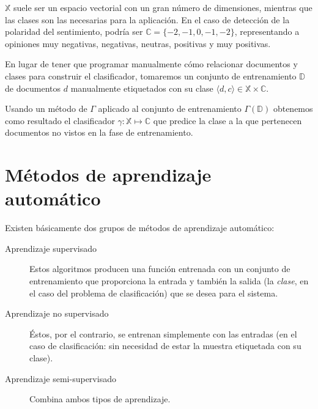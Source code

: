 $\mathbb{X}$ suele ser un espacio vectorial con un gran número de dimensiones, mientras que las clases son las necesarias para la aplicación. En el caso de detección de la polaridad del sentimiento, podría ser $\mathbb{C}=\{-2,-1,0,-1,-2\}$, representando a opiniones muy negativas, negativas, neutras, positivas y muy positivas.

En lugar de tener que programar manualmente cómo relacionar documentos y clases para construir el clasificador, tomaremos un conjunto de entrenamiento $\mathbb{D}$ de documentos $d$ manualmente etiquetados con su clase $\langle d, c \rangle \in \mathbb{X} \times \mathbb{C}$.

Usando un método de  $\Gamma$ aplicado al conjunto de entrenamiento $\Gamma(\mathbb{D})$ obtenemos como resultado el clasificador $\gamma : \mathbb{X} \mapsto \mathbb{C}$ \citep{Manning2008} que predice la clase a la que pertenecen documentos no vistos en la fase de entrenamiento.

\section{Métodos de aprendizaje automático}

Existen básicamente dos grupos de métodos de aprendizaje automático:
\nopagebreak
\begin{description}
\item[Aprendizaje supervisado] Estos algoritmos producen una función entrenada con un conjunto de entrenamiento que proporciona la entrada y también la salida (la \emph{clase}, en el caso del problema de clasificación) que se desea para el sistema.
\item[Aprendizaje no supervisado] Éstos, por el contrario, se entrenan simplemente con las entradas (en el caso de clasificación: sin necesidad de estar la muestra etiquetada con su clase).
\item[Aprendizaje semi-supervisado] Combina ambos tipos de aprendizaje.
\end{description}

